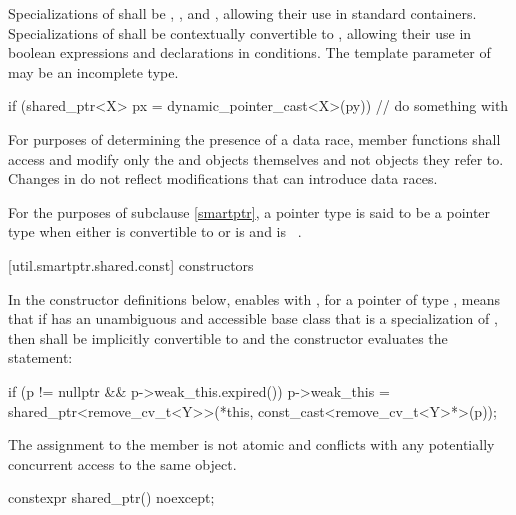 \pnum
Specializations of  shall be ,
, and , allowing their use in standard
containers. Specializations of  shall be
contextually convertible to ,
allowing their use in boolean expressions and declarations in conditions. The template
parameter  of  may be an incomplete type.

\pnum
\begin{example}
\begin{codeblock}
if (shared_ptr<X> px = dynamic_pointer_cast<X>(py)) {
  // do something with 
}
\end{codeblock}
\end{example}

\pnum
For purposes of determining the presence of a data race, member functions shall
access and modify only the  and  objects
themselves and not objects they refer to. Changes in  do not
reflect modifications that can introduce data races.

\pnum
For the purposes of subclause \ref{smartptr},
a pointer type  is said to be
a pointer type  when either
 is convertible to  or
 is  and  is \cv{}~.

[util.smartptr.shared.const]{ constructors}

\pnum
In the constructor definitions below,
enables  with ,
for a pointer  of type ,
means that if  has an unambiguous and accessible base class
that is a specialization of ,
then  shall be implicitly convertible to  and
the constructor evaluates the statement:
\begin{codeblock}
if (p != nullptr && p->weak_this.expired())
  p->weak_this = shared_ptr<remove_cv_t<Y>>(*this, const_cast<remove_cv_t<Y>*>(p));
\end{codeblock}
The assignment to the  member is not atomic and
conflicts with any potentially concurrent access to the same object.

%
\begin{itemdecl}
constexpr shared_ptr() noexcept;
\end{itemdecl}

